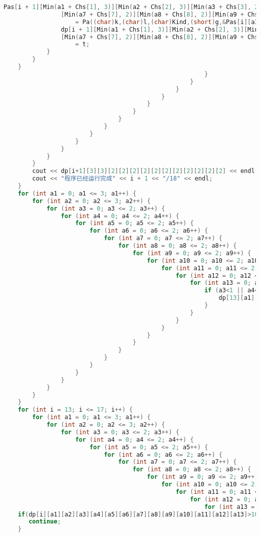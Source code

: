 \begin{lstlisting}[language=C++, numberstyle={\color{black!33}\tiny\sffamily}, basicstyle=\tiny]
				Pas[i + 1][Min(a1 + Chs[1], 3)][Min(a2 + Chs[2], 3)][Min(a3 + Chs[3], 2)][Min(a4 + Chs[4], 2)][Min(a5 + Chs[5], 2)][Min(a6 + Chs[6], 2)]
				[Min(a7 + Chs[7], 2)][Min(a8 + Chs[8], 2)][Min(a9 + Chs[9], 2)][Min(a10 + Chs[10], 2)][Min(a11 + Chs[11], 2)][Min(a12 + Chs[12], 2)][Min(a13 + Chs[13], 2)]
					= Pa((char)k,(char)l,(char)Kind,(short)g,&Pas[i][a1][a2][a3][a4][a5][a6][a7][a8][a9][a10][a11][a12][a13]);
				dp[i + 1][Min(a1 + Chs[1], 3)][Min(a2 + Chs[2], 3)][Min(a3 + Chs[3], 2)][Min(a4 + Chs[4], 2)][Min(a5 + Chs[5], 2)][Min(a6 + Chs[6], 2)]
				[Min(a7 + Chs[7], 2)][Min(a8 + Chs[8], 2)][Min(a9 + Chs[9], 2)][Min(a10 + Chs[10], 2)][Min(a11 + Chs[11], 2)][Min(a12 + Chs[12], 2)][Min(a13 + Chs[13], 2)]
					= t;
			}
		}
	}
														}
													}
												}
											}
										}
									}
								}
							}
						}
					}
				}
			}
		}
		cout << dp[i+1][3][3][2][2][2][2][2][2][2][2][2][2][2] << endl;
		cout << "程序已经运行完成" << i + 1 << "/18" << endl;
	}
	for (int a1 = 0; a1 <= 3; a1++) {
		for (int a2 = 0; a2 <= 3; a2++) {
			for (int a3 = 0; a3 <= 2; a3++) {
				for (int a4 = 0; a4 <= 2; a4++) {
					for (int a5 = 0; a5 <= 2; a5++) {
						for (int a6 = 0; a6 <= 2; a6++) {
							for (int a7 = 0; a7 <= 2; a7++) {
								for (int a8 = 0; a8 <= 2; a8++) {
									for (int a9 = 0; a9 <= 2; a9++) {
										for (int a10 = 0; a10 <= 2; a10++) {
											for (int a11 = 0; a11 <= 2; a11++) {
												for (int a12 = 0; a12 <= 2; a12++) {
													for (int a13 = 0; a13 <= 2; a13++) {
														if (a3<1 || a4<1 || a5<1 || a6<1 || a7<1 || a8<1 || a9<1 || a10<1 || a11<1) {
															dp[13][a1][a2][a3][a4][a5][a6][a7][a8][a9][a10][a11][a12][a13] = INF;
														}
													}
												}
											}
										}
									}
								}
							}
						}
					}
				}
			}
		}
	}
	for (int i = 13; i <= 17; i++) {
		for (int a1 = 0; a1 <= 3; a1++) {
			for (int a2 = 0; a2 <= 3; a2++) {
				for (int a3 = 0; a3 <= 2; a3++) {
					for (int a4 = 0; a4 <= 2; a4++) {
						for (int a5 = 0; a5 <= 2; a5++) {
							for (int a6 = 0; a6 <= 2; a6++) {
								for (int a7 = 0; a7 <= 2; a7++) {
									for (int a8 = 0; a8 <= 2; a8++) {
										for (int a9 = 0; a9 <= 2; a9++) {
											for (int a10 = 0; a10 <= 2; a10++) {
												for (int a11 = 0; a11 <= 2; a11++) {
													for (int a12 = 0; a12 <= 2; a12++) {
														for (int a13 = 0; a13 <= 2; a13++) {
	if(dp[i][a1][a2][a3][a4][a5][a6][a7][a8][a9][a10][a11][a12][a13]>1000000){
       continue;
    }


\end{lstlisting}
